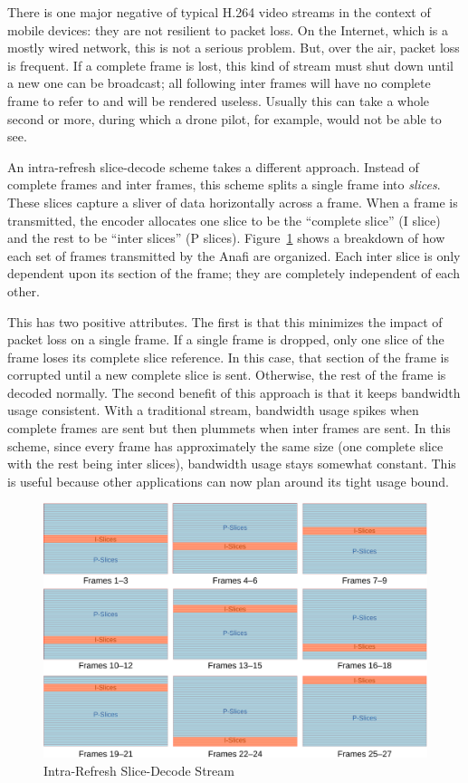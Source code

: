 There is one major negative of typical H.264 video streams in the context of mobile devices: they are not resilient to packet loss. On the Internet, which is a mostly wired network, this is not a serious problem. But, over the air, packet loss is frequent. If a complete frame is lost, this kind of stream must shut down until a new one can be broadcast; all following inter frames will have no complete frame to refer to and will be rendered useless. Usually this can take a whole second or more, during which a drone pilot, for example, would not be able to see.

An intra-refresh slice-decode scheme takes a different approach. Instead of complete frames and inter frames, this scheme splits a single frame into \textit{slices}. These slices capture a sliver of data horizontally across a frame. When a frame is transmitted, the encoder allocates one slice to be the ``complete slice'' (I slice) and the rest to be ``inter slices'' (P slices). Figure~\ref{fig:slice-encoding} shows a breakdown of how each set of frames transmitted by the Anafi are organized. Each inter slice is only dependent upon its section of the frame; they are completely independent of each other. 

This has two positive attributes. The first is that this minimizes the impact of packet loss on a single frame. If a single frame is dropped, only one slice of the frame loses its complete slice reference. In this case, that section of the frame is corrupted until a new complete slice is sent. Otherwise, the rest of the frame is decoded normally. The second benefit of this approach is that it keeps bandwidth usage consistent. With a traditional stream, bandwidth usage spikes when complete frames are sent but then plummets when inter frames are sent. In this scheme, since every frame has approximately the same size (one complete slice with the rest being inter slices), bandwidth usage stays somewhat constant. This is useful because other applications can now plan around its tight usage bound.

\begin{figure}
    \centering
    \includegraphics[width=0.8\linewidth]{chapter3/FIGS/slice-encoding-crop.pdf}
    \caption{Intra-Refresh Slice-Decode Stream}
    \label{fig:slice-encoding}
\end{figure}

